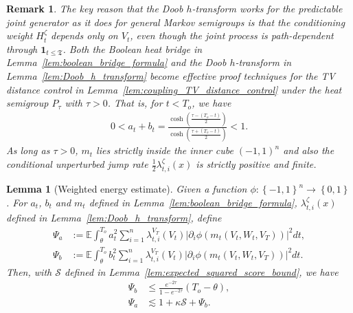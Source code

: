 \documentclass[11pt]{article}
\newcommand{\cS}{\mathcal{S}}
\newcommand{\btau}{\kappa}
\newcommand{\stopT}{{\boldsymbol{\mathfrak{T}}}}
\newcommand{\uV}{V}
\newcommand{\uW}{W}
\newcommand{\To}{{T_o}}
\theoremstyle{named}
\theoremstyle{plain}
\newtheorem{lemma}{Lemma}
\newtheorem{remark}{Remark}
\newcommand{\defn}{:=}
\newcommand{\Exs}{\ensuremath{{\mathbb{E}}}}
\newcommand{\parenth}[1]{\left( #1 \right)}
\newcommand{\braces}[1]{\left\{ #1 \right \}}
\newcommand{\abss}[1]{\left| #1 \right |}
\begin{document}
\begin{remark}
  The key reason that the Doob $h$-transform works for the predictable joint generator as it does for general Markov semigroups is that the conditioning weight $H_t^{\zeta}$ depends only on $\uV_t$, even though the joint process is path-dependent through $\mathbf{1}_{t \leq \stopT}$. Both the Boolean heat bridge in Lemma~\ref{lem:boolean_bridge_formula} and the Doob $h$-transform in Lemma~\ref{lem:Doob_h_transform} become effective proof techniques for the TV distance control in Lemma~\ref{lem:coupling_TV_distance_control} under the heat semigroup $P_\tau$ with $\tau >0$. That is, for $t < \To$, we have
  \begin{align*}
    0 < a_t + b_t = \frac{\cosh\parenth{\frac{\tau- (\To - t)}{2}}}{\cosh\parenth{\frac{\tau+(\To - t)}{2}}} < 1.
  \end{align*}
  As long as $\tau > 0$, $m_t$ lies strictly inside the inner cube $(-1,1)^n$ and also the conditional unperturbed jump rate $\frac12 \lambda_{t, i}^{\zeta}(x)$ is strictly positive and finite. 
\end{remark}

\begin{lemma}[Weighted energy estimate]
  \label{lem:weighted_energy_estimate}
  Given a function $\phi:\braces{-1,1}^n \to \braces{0, 1}$. For $a_{t}$, $b_{t}$ and $m_{t}$ defined in Lemma~\ref{lem:boolean_bridge_formula}, $\lambda_{t, i}^{\zeta}(x)$ defined in Lemma~\ref{lem:Doob_h_transform}, define
  \begin{align*}
    \Psi_a &\defn \Exs \int_\theta^{\To} a_{t}^2 \sum_{i=1}^n \lambda_{t, i}^{\uV_T}(\uV_t) \abss{\partial_i \phi(m_{t}(\uV_t, \uW_t, \uV_T))}^2 dt, \\
    \Psi_b &\defn \Exs \int_\theta^{\To} b_{t}^2 \sum_{i=1}^n \lambda_{t, i}^{\uV_T}(\uV_t) \abss{\partial_i \phi(m_{t}(\uV_t, \uW_t, \uV_T))}^2 dt.
  \end{align*}
  Then, with $\cS$ defined in Lemma~\ref{lem:expected_squared_score_bound}, we have
  \begin{align*}
    \Psi_b &\leq \frac{e^{-2\tau}}{1-e^{-2\tau}} \parenth{\To - \theta}, \\
    \Psi_a &\lesssim 1 + \btau \cS + \Psi_b.
  \end{align*}
\end{lemma}
\end{document}
